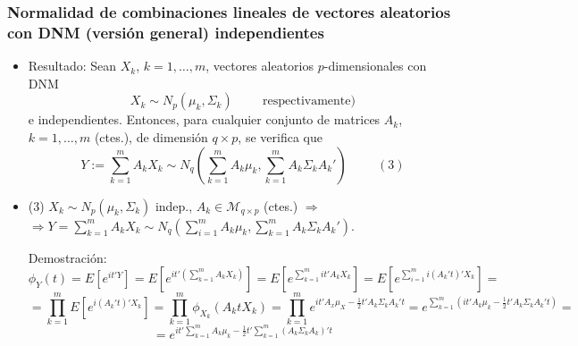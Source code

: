 \documentclass[11pt,a4paper]{article}
\begin{document}
\subsubsection{Normalidad de combinaciones lineales de vectores aleatorios con DNM (versión general) independientes}
\begin{itemize}
\item Resultado: Sean $X_{k}$, $k = 1, \dots, m$, vectores aleatorios $p$-dimensionales con DNM
$$X_{k} \sim N_{p}(\mu_{k}, \Sigma_{k}) \hspace{1cm} \text{respectivamente)}$$
e independientes. Entonces, para cualquier conjunto de matrices $A_{k}$, $k = 1, \dots, m$ (ctes.), de dimensión $q \times p$, se verifica que
$$Y := \sum_{k=1}^{m} A_{k}X_{k} \sim N_{q}(\sum_{k=1}^{m}A_{k}\mu_{k}, \sum_{k=1}^{m}A_{k}\Sigma_{k}A_{k}') \hspace{1cm} (3)$$

\item (3) $X_{k} \sim N_{p}(\mu_{k}, \Sigma_{k})$ indep., $A_{k} \in \mathcal{M}_{q \times p}$ (ctes.) $\Rightarrow$ \\ $\Rightarrow Y = \sum_{k=1}^{m} A_{k}X_{k} \sim N_{q} (\sum_{i=1}^{m} A_{k}\mu_{k}, \sum_{k=1}^{m}A_{k}\Sigma_{k}A_{k}')$.

Demostración:
$$\phi_{Y}(t) = E[e^{it'Y}] = E[e^{it'(\sum_{k=1}^{m}A_{k}X_{k})}] = E[e^{\sum_{k=1}^{m} it'A_{k}X_{k}}] = E[e^{\sum_{i=1}^{m} i(A_{k}'t)'X_{k}}] =$$
$$= \prod_{k=1}^{m} E[e^{i(A_{k}'t)'X_{k}}] = \prod_{k=1}^{m} \phi_{X_{k}}(A_{k}tX_{k}) = \prod_{k=1}^{m} e^{it'A_{x}\mu_{X} - \frac{1}{2}t'A_{k}\Sigma_{k}A_{k}'t} = e^{\sum_{k=1}^{m}(it'A_{k}\mu_{k} - \frac{1}{2}t'A_{k}\Sigma_{k}A_{k}'t)} =$$
$$= e^{it'\sum_{k=1}^{m}A_{k}\mu_{k} - \frac{1}{2}t'\sum_{k=1}^{m}(A_{k}\Sigma_{k}A_{k})'t}$$
\end{itemize}
\end{document}
